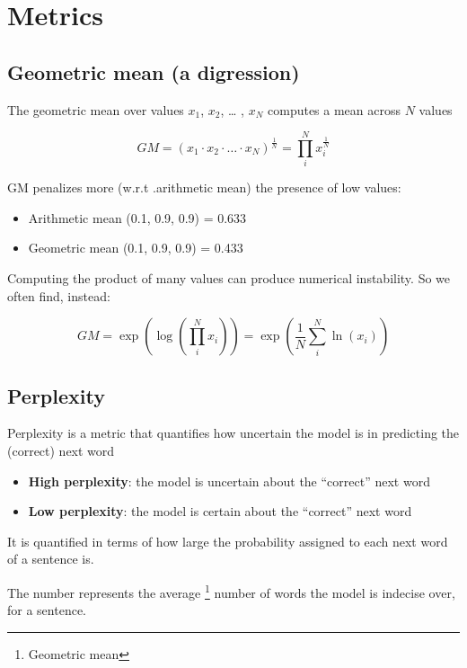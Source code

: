 \chapter{Metrics}

\section{Geometric mean (a digression)}
The geometric mean over values $x_1$, $x_2$, … , $x_N$ computes a mean across $N$ values

\begin{equation*}
  GM = (x_1 \cdot x_2 \cdot … \cdot x_N)^{\frac{1}{N}} = \prod_{i}^{N} x_i^{\frac{1}{N}}
\end{equation*}

GM penalizes more (w.r.t .arithmetic mean) the presence of
low values:

\begin{itemize}
  \item Arithmetic mean (0.1, 0.9, 0.9) = 0.633
  \item Geometric mean (0.1, 0.9, 0.9) = 0.433
\end{itemize}

Computing the product of many values can produce numerical instability.
So we often find, instead:

\begin{equation*}
  GM = \exp(\log(\prod_{i}^{N} x_i)) = \exp(\frac{1}{N} \sum_{i}^{N} \ln(x_i))
\end{equation*}


\section{Perplexity}

Perplexity is a metric that quantifies how uncertain the model is in
predicting the (correct) next word

\begin{itemize}
  \item \textbf{High perplexity}: the model is uncertain about the “correct” next word
  \item \textbf{Low perplexity}: the model is certain about the “correct” next word
\end{itemize}
It is quantified in terms of how large the probability assigned to each
next word of a sentence is.

The number represents the average \footnote{Geometric mean} number of words the model is
indecise over, for a sentence.

